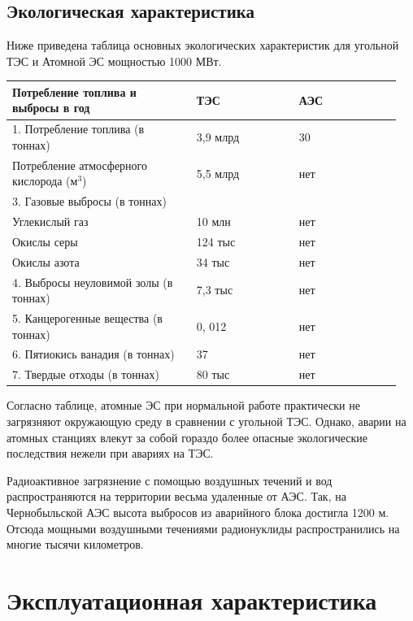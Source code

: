 \documentclass[a4paper,12pt]{article}
\begin{document}
	\subsection*{Экологическая характеристика}
	
	Ниже приведена таблица основных экологических характеристик для угольной ТЭС и Атомной ЭС  мощностью 1000 МВт.
	
	\begin{center}
		\begin{longtable}[h!]{|p{0.45\linewidth}|p{0.25\linewidth}|p{ 0.25\linewidth}|}
			\hline
			{Потребление топлива и выбросы в год} & {ТЭС} & {АЭС}\\
			\hline
			{1. Потребление топлива (в тоннах)} & {3,9 млрд} & {30}\\
			\hline
			{Потребление атмосферного кислорода (м$^3$)} & {5,5 млрд} & {нет}\\
			\hline
			{3. Газовые выбросы (в тоннах)} & {} & {}\\
			\hline
			{Углекислый газ} & {10 млн} & {нет}\\
			\hline
			{Окислы серы} & {124 тыс} & {нет}\\
			\hline
			{Окислы азота} & {34 тыс} & {нет}\\
			\hline
			{4. Выбросы неуловимой золы (в тоннах)} & {7,3 тыс} & {нет}\\
			\hline
			{5. Канцерогенные вещества (в тоннах)} & {0, 012} & {нет}\\
			\hline
			{6. Пятиокись ванадия (в тоннах)} & {37} & {нет}\\
			\hline
			{7. Твердые отходы (в тоннах)} & {80 тыс} & {нет}\\
			\hline
		\end{longtable}
	\end{center}

	Согласно таблице, атомные ЭС при нормальной работе практически не загрязняют окружающую среду в сравнении с угольной ТЭС. Однако, аварии на атомных станциях влекут за собой гораздо более опасные экологические последствия нежели при авариях на ТЭС.
	
	Радиоактивное загрязнение с помощью воздушных течений и вод распространяются на территории весьма удаленные от АЭС. Так, на Чернобыльской АЭС высота выбросов из аварийного блока достигла 1200 м. Отсюда мощными воздушными течениями радионуклиды распространились на многие тысячи километров.
	
	\section*{Эксплуатационная характеристика}
	
\end{document}
